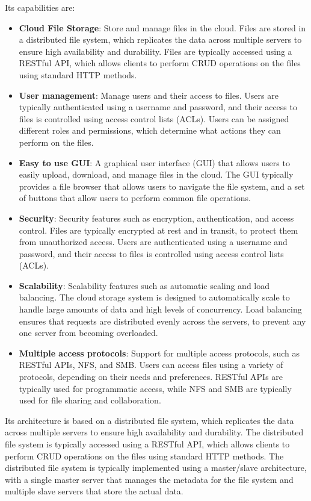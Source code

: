 Its capabilities are:
\begin{itemize}
    \item \textbf{Cloud File Storage}: Store and manage files in the cloud. Files are stored in a distributed file system, which replicates the data across multiple servers to ensure high availability and durability. Files are typically accessed using a RESTful API, which allows clients to perform CRUD operations on the files using standard HTTP methods.
    \item \textbf{User management}: Manage users and their access to files. Users are typically authenticated using a username and password, and their access to files is controlled using access control lists (ACLs). Users can be assigned different roles and permissions, which determine what actions they can perform on the files.
    \item \textbf{Easy to use GUI}: A graphical user interface (GUI) that allows users to easily upload, download, and manage files in the cloud. The GUI typically provides a file browser that allows users to navigate the file system, and a set of buttons that allow users to perform common file operations.
    \item \textbf{Security}: Security features such as encryption, authentication, and access control. Files are typically encrypted at rest and in transit, to protect them from unauthorized access. Users are authenticated using a username and password, and their access to files is controlled using access control lists (ACLs).
    \item \textbf{Scalability}: Scalability features such as automatic scaling and load balancing. The cloud storage system is designed to automatically scale to handle large amounts of data and high levels of concurrency. Load balancing ensures that requests are distributed evenly across the servers, to prevent any one server from becoming overloaded.
    \item \textbf{Multiple access protocols}: Support for multiple access protocols, such as RESTful APIs, NFS, and SMB. Users can access files using a variety of protocols, depending on their needs and preferences. RESTful APIs are typically used for programmatic access, while NFS and SMB are typically used for file sharing and collaboration.
\end{itemize}

Its architecture is based on a distributed file system, which replicates the data across multiple servers to ensure high availability and durability. The distributed file system is typically accessed using a RESTful API, which allows clients to perform CRUD operations on the files using standard HTTP methods. The distributed file system is typically implemented using a master/slave architecture, with a single master server that manages the metadata for the file system and multiple slave servers that store the actual data.

